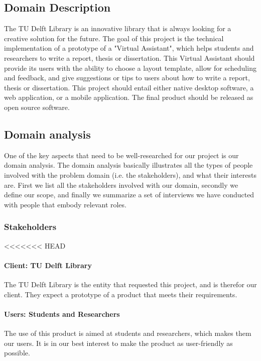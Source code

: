\subsection{Domain Description} %
\label{sub:problem_description}

The TU Delft Library is an innovative library that is always looking for a creative solution for the future. The goal of this project is the technical implementation of a prototype of a "Virtual Assistant", which helps students and researchers to write a report, thesis or dissertation. This Virtual Assistant should provide its users with the ability to choose a layout template, allow for scheduling and feedback, and give suggestions or tips to users about how to write a report, thesis or dissertation.
This project should entail either native desktop software, a web application, or a mobile application. The final product should be released as open source software.

\subsection{Domain analysis} %

One of the key aspects that need to be well-researched for our project is our domain analysis. The domain analysis basically illustrates all the types of people involved with the problem domain (i.e. the stakeholders), and what their interests are. First we list all the stakeholders involved with our domain, secondly we define our scope, and finally we summarize a set of interviews we have conducted with people that embody relevant roles.

\subsubsection{Stakeholders} %
<<<<<<< HEAD

\paragraph{Client: TU Delft Library} The TU Delft Library is the entity that requested this project, and is therefor our client. They expect a prototype of a product that meets their requirements.

\paragraph{Users: Students and Researchers} The use of this product is aimed at students and researchers, which makes them our users. It is in our best interest to make the product as user-friendly as possible.


